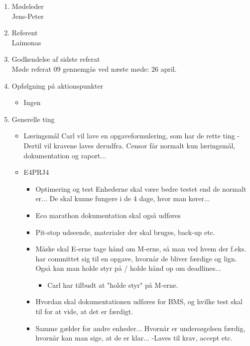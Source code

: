	\begin{enumerate}
		\itemsep 0.3em 
		\item Mødeleder\\
			Jens-Peter
		\item Referent\\
			Laimonas
		\item Godkendelse af sidste referat\\
			Møde referat 09 gennemgås ved næste møde: 26 april. 

		\item Opfølgning på aktionspunkter
		\begin{itemize}
			\itemsep 0.3em 
			\item Ingen
		\end{itemize}
		
		\item Generelle ting
			\begin{itemize}
				\item Læringsmål
				Carl vil lave en opgaveformulering, som har de rette ting - Dertil vil kravene laves derudfra.
				Censor får normalt kun læringsmål, dokumentation og raport...
			
				\item E4PRJ4
				
				\begin{itemize}
				\item Optimering og test
				Enhederne skal være bedre testet end de normalt er...
				De skal kunne fungere i de 4 dage, hvor man kører...
				\item Eco marathon dokumentation skal også udføres
				\item Pit-stop udseende, materialer der skal bruges, back-up etc.
				\item Måske skal E-erne tage hånd om M-erne, så man ved hvem der f.eks. har committet sig til en opgave, hvornår de bliver færdige og lign. Også kan man holde styr på / holde hånd op om deadlines...
					\begin{itemize}
						\item Carl har tilbudt at "holde styr" på M-erne.
					\end{itemize}
				
				\item Hvordan skal dokumentationen udføres for BMS, og hvilke test skal til for at vide, at det er færdigt. 
				\item Samme gælder for andre enheder... Hvornår er undersøgelsen færdig, hvornår kan man sige, at de er klar...
					-Laves til krav, accept etc.
					

\end{itemize}
\end{itemize}
\end{enumerate}
